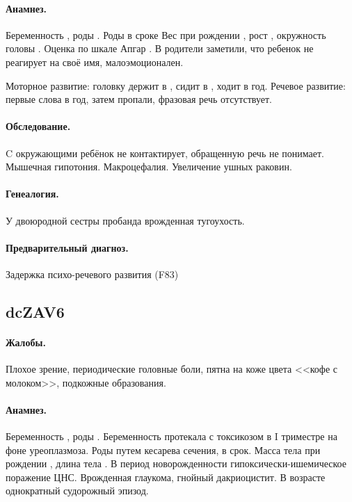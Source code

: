 \documentclass[a4paper,14pt]{extarticle}
\newcommand{\gramm}{г}
\newcommand{\cm}{см}
\newcommand{\months}{мес.}
\newcommand{\weeks}{нед.}
\begin{document}
\paragraph{Анамнез.}
Беременность , роды .
Роды в сроке \numprint[\weeks]{40}
Вес при рождении \numprint[\gramm]{2800}, рост \numprint[\cm]{50}, окружность головы \numprint[\cm]{34}.
Оценка по шкале Апгар .
В \numprint[\months]{6} родители заметили, что ребенок не реагирует на своё имя, малоэмоционален.

Моторное развитие: головку держит в \numprint[\months]{2}, сидит в \numprint[\months]{6}, ходит в год.
Речевое развитие: первые слова в год, затем пропали, фразовая речь отсутствует.

\paragraph{Обследование.}
C окружающими ребёнок не контактирует, обращенную речь не понимает.
Мышечная гипотония.
Макроцефалия.
Увеличение ушных раковин.

\paragraph{Генеалогия.}
У двоюродной сестры пробанда врожденная тугоухость.

\paragraph{Предварительный диагноз.}
Задержка психо-речевого развития (F83)

\subsection*{dcZAV6}

\paragraph{Жалобы.}
Плохое зрение, периодические головные боли, пятна на коже цвета <<кофе с молоком>>, подкожные образования.

\paragraph{Анамнез.}
Беременность , роды .
Беременность протекала с токсикозом в I триместре на фоне уреоплазмоза.
Роды путем кесарева сечения, в срок.
Масса тела при рождении \numprint[\gramm]{4040}, длина тела \numprint[\cm]{53}.
В период новорожденности гипоксически-ишемическое поражение ЦНС.
Врожденная глаукома, гнойный дакриоцистит.
В возрасте \numprint[\months]{3} однократный судорожный эпизод.
\end{document}
